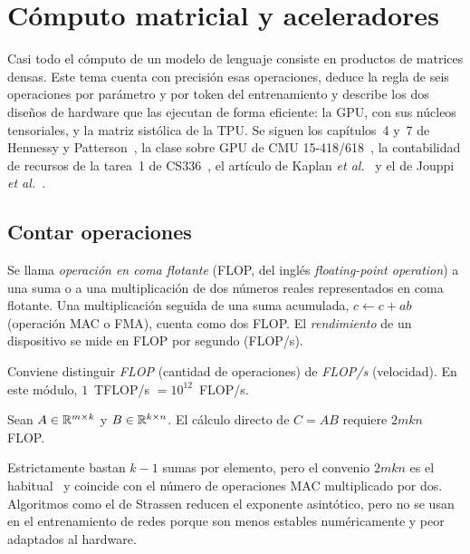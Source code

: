 \chapter{Cómputo matricial y aceleradores}
\label{tema:1}

Casi todo el cómputo de un modelo de lenguaje consiste en productos de matrices densas. Este tema cuenta con precisión esas operaciones, deduce la regla de seis operaciones por parámetro y por token del entrenamiento y describe los dos diseños de hardware que las ejecutan de forma eficiente: la GPU, con sus núcleos tensoriales, y la matriz sistólica de la TPU. Se siguen los capítulos~4 y~7 de Hennessy y Patterson~\cite{hp}, la clase sobre GPU de CMU 15-418/618~\cite{cmu418}, la contabilidad de recursos de la tarea~1 de CS336~\cite[§3.5]{cs336a1}, el artículo de Kaplan \emph{et al.}~\cite[§2.1]{kaplan} y el de Jouppi \emph{et al.}~\cite{jouppi}.

\section{Contar operaciones}

\begin{definicion}[FLOP]
Se llama \emph{operación en coma flotante} (FLOP, del inglés \emph{floating-point operation}) a una suma o a una multiplicación de dos números reales representados en coma flotante. Una multiplicación seguida de una suma acumulada, $c\gets c+ab$ (operación MAC o FMA), cuenta como dos FLOP. El \emph{rendimiento} de un dispositivo se mide en FLOP por segundo (FLOP/s).
\end{definicion}

Conviene distinguir \emph{FLOP} (cantidad de operaciones) de \emph{FLOP/s} (velocidad). En este módulo, $1$~TFLOP/s $=10^{12}$~FLOP/s.

\begin{proposicion}\label{prop:flop-matmul}
Sean $A\in\mathbb{R}^{m\times k}$ y $B\in\mathbb{R}^{k\times n}$. El cálculo directo de $C=AB$ requiere $2mkn$ FLOP.
\end{proposicion}

\begin{observacion}
Estrictamente bastan $k-1$ sumas por elemento, pero el convenio $2mkn$ es el habitual~\cite[§3.5]{cs336a1} y coincide con el número de operaciones MAC multiplicado por dos. Algoritmos como el de Strassen reducen el exponente asintótico, pero no se usan en el entrenamiento de redes porque son menos estables numéricamente y peor adaptados al hardware.
\end{observacion}

